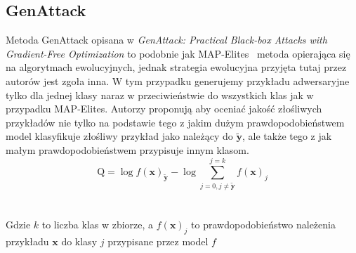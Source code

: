 \documentclass[
    left=2.5cm,         %
    right=2.5cm,        %
    top=2.5cm,          %
    bottom=3cm,         %
    bindingoffset=6mm,  %
    nohyphenation=false %
]{eiti/eiti-thesis}
\renewcommand{\vec}[1]{\mathbf{#1}}
\begin{document}
\subsection{GenAttack}
Metoda GenAttack opisana w
\textit{GenAttack: Practical Black-box Attacks with Gradient-Free Optimization}\cite{DBLP:journals/corr/abs-1805-11090}
to podobnie jak MAP-Elites~\cite{DBLP:journals/corr/NguyenYC14} metoda opierająca się na algorytmach ewolucyjnych, jednak strategia ewolucyjna
przyjęta tutaj przez autorów jest zgoła inna. W tym przypadku generujemy przykładu adwersaryjne tylko dla jednej klasy naraz
w przeciwieństwie do wszystkich klas jak w przypadku MAP-Elites.
Autorzy proponują aby oceniać jakość złośliwych przykładów nie tylko na podstawie tego z jakim dużym prawdopodobieństwem
model klasyfikuje złośliwy przykład jako należący do \(\vec{\widetilde{y}}\), ale także tego z jak małym prawdopodobieństwem przypisuje innym klasom.
\begin{equation}
    \text{Q} = \log{f(\vec{x})}_{\vec{\widetilde{y}}} - \log\sum^{j=k}_{j=0,j\neq \vec{\widetilde{y}}} f(\vec{x})_j
\end{equation}
\\~\\
Gdzie \(k\) to liczba klas w zbiorze, a \(f(\vec{x})_j\) to prawdopodobieństwo należenia przykładu \(\vec{x}\) do klasy \(j\) przypisane przez model \(f\)
\end{document}
